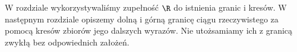 \begin{uwaga}
W rozdziale wykorzystywaliśmy zupełność $\R$ do istnienia granic i kresów. W następnym rozdziale opiszemy dolną i górną granicę ciągu rzeczywistego za pomocą kresów zbiorów jego dalszych wyrazów. Nie utożsamiamy ich z granicą zwykłą bez odpowiednich założeń.
\end{uwaga}
